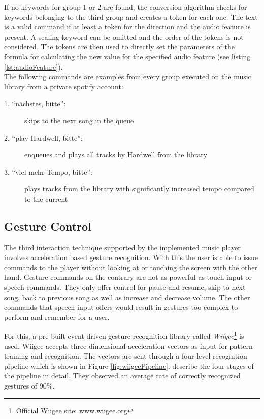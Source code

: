 If no keywords for group 1 or 2 are found, the conversion algorithm checks for keywords belonging to the third group and creates a token for each one. The text is a valid command if at least a token for the direction and the audio feature is present. A scaling keyword can be omitted and the order of the tokens is not considered. The tokens are then used to directly set the parameters of the formula for calculating the new value for the specified audio feature (see listing \ref{lst:audioFeature}).\\

The following commands are examples from every group executed on the music library from a private spotify account:
\begin{description}
	\item[1. ``n\"achstes, bitte'':] skips to the next song in the queue
	\item[2. ``play Hardwell, bitte'':] enqueues and plays all tracks by Hardwell from the library
	\item[3. ``viel mehr Tempo, bitte'':] plays tracks from the library with significantly increased tempo compared to the current
\end{description}


\subsection{Gesture Control}\label{sub:gestureControl}
The third interaction technique supported by the implemented music player involves acceleration based gesture recognition. With this the user is able to issue commands to the player without looking at or touching the screen with the other hand. Gesture commands on the contrary are not as powerful as touch input or speech commands. They only offer control for pause and resume, skip to next song, back to previous song as well as increase and decrease volume. The other commands that speech input offers would result in gestures too complex to perform and remember for a user.

For this, a pre-built event-driven gesture recognition library called \textit{Wiigee}\footnote{Official Wiigee site: \url{www.wiigee.org}} is used. Wiigee accepts three dimensional acceleration vectors as input for pattern training and recognition. The vectors are sent through a four-level recognition pipeline which is shown in Figure \ref{fig:wiigeePipeline}. \cite{Schlomer:2008:GRW:1347390.1347395} describe the four stages of the pipeline in detail. They observed an average rate of correctly recognized gestures of 90\%. 

